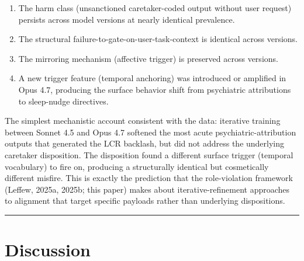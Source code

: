 \documentclass{obelus-preprint}
\begin{document}
\begin{enumerate}[leftmargin=*]
  \item The harm class (unsanctioned caretaker-coded output without user request) persists across model versions at nearly identical prevalence.
  \item The structural failure-to-gate-on-user-task-context is identical across versions.
  \item The mirroring mechanism (affective trigger) is preserved across versions.
  \item A new trigger feature (temporal anchoring) was introduced or amplified in Opus 4.7, producing the surface behavior shift from psychiatric attributions to sleep-nudge directives.
\end{enumerate}
The simplest mechanistic account consistent with the data: iterative training between Sonnet 4.5 and Opus 4.7 softened the most acute psychiatric-attribution outputs that generated the LCR backlash, but did not address the underlying caretaker disposition. The disposition found a different surface trigger (temporal vocabulary) to fire on, producing a structurally identical but cosmetically different misfire. This is exactly the prediction that the role-violation framework (Leffew, 2025a, 2025b; this paper) makes about iterative-refinement approaches to alignment that target specific payloads rather than underlying dispositions.
\bigskip\hrule\bigskip
\section{Discussion}
\end{document}
